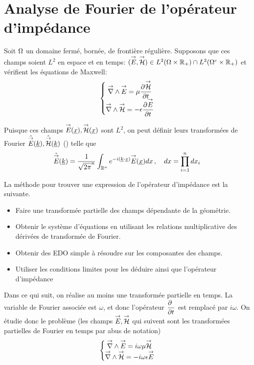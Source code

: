 \section{Analyse de Fourier de l'opérateur d'impédance}
Soit $\OO$ un domaine fermé, bornée, de frontière régulière. Supposons que ces champs soient $L^2$ en espace et en temps: $(\vE,\vH) \in L^2(\OO \times \RR_+) \cap L^2(\OO^c\times\RR_+)$ et vérifient les équations de Maxwell:
\begin{equation}
    \left\lbrace 
    \begin{matrix}
    \vrot \vE = \mu \ddr{t}{\vH} \\
    \vrot \vH = -\eps \ddr{t}{\vE}
    \end{matrix}
    \right.
\end{equation}

Puisque ces champs $\vE(\v{x}),\vH(\v{x})$ sont $L^2$, on peut définir leurs transformées de Fourier $\hat{\vE}(\v{k}), \hat{\vH}(\v{k})$ (\cite[Théorème de Plancherel, p.~153]{yosida_functional_1995}) telle que
\begin{equation}
    \hat{\vE} (\v{k}) = \frac{1}{\sqrt{2\pi}^n}\int_{\RR^n} e^{-i(\v{k} \cdot \v{x})}\vE(\v{x}) dx\,, \quad dx = \prod\limits_{i=1}^n dx_i
\end{equation}

La méthode pour trouver une expression de l'opérateur d'impédance est la suivante.
\begin{itemize}
\item Faire une transformée partielle des champs dépendante de la géométrie.
\item Obtenir le système d'équations en utilisant les relations multiplicative des dérivées de transformée de Fourier.
\item Obtenir des EDO simple à résoudre sur les composantes des champs.
\item Utiliser les conditions limites pour les déduire ainsi que l'opérateur d'impédance
\end{itemize}

Dans ce qui suit, on réalise au moins une transformée partielle en temps. La variable de Fourier associée est $\omega$, et donc l'opérateur $\ddr{t}{~}$ est remplacé par $i\omega$. On étudie donc le problème (les champs $\vE,\vH$ qui suivent sont les transformées partielles de Fourier en temps par abus de notation)
\begin{equation}
    \left\lbrace 
    \begin{matrix}
    \vrot \vE = i \omega \mu \vH \\
    \vrot \vH = -i \omega \eps \vE
    \end{matrix}
    \right.
\end{equation}
